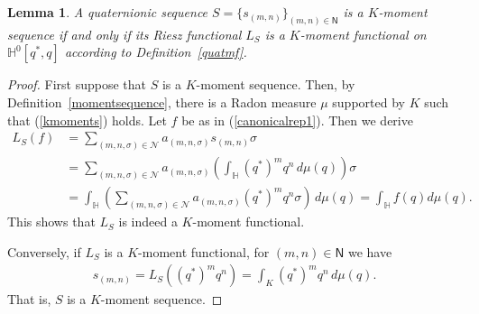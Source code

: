 \documentclass[11pt,a4paper]{amsart}
\newtheorem{lemma}[theorem]{Lemma}
\theoremstyle{definition}
\begin{document}
\begin{lemma}%
\label{Riesz}
A quaternionic sequence $S=\{s_{(m,n)}\}_{(m,n) \in \mathsf{{N}}}$ is a
$K$-moment sequence if and only if its Riesz functional $L_{S}$ is a
$K$-moment functional on $\mathbb{H}^{0}[q^{*}, q]$ according to Definition~\ref{quatmf}.
\end{lemma}
%
\begin{proof}
First suppose that $S$ is a $K$-moment sequence. Then, by Definition~\ref{momentsequence}, there is a Radon measure $\mu $ supported by
$K$ such that (\ref{kmoments}) holds. Let $f$ be as in (\ref{canonicalrep1}).
Then we derive
%
\begin{align*}
L_{S}(f) &= \sum _{(m,n,\sigma )\in \mathcal{N}} a_{(m,n,\sigma )}s_{(m,n)}
\sigma
\\
&= \sum _{(m,n,\sigma )\in \mathcal{N}} a_{(m,n,\sigma )} \left (
\int _{\mathbb{H}} (q^{*})^{m} q^{n}\, d\mu (q)\right ) \sigma
\\
&=\int _{\mathbb{H}} \left (\sum _{(m,n,\sigma )\in \mathcal{N}} a_{(m,n,
\sigma )} (q^{*})^{m} q^{n} \sigma \right )\, d\mu (q)=\int _{
\mathbb{H}} f(q) d\mu (q) .
\end{align*}
%
This shows that $L_{S}$ is indeed a $K$-moment functional.

Conversely, if $L_{S}$ is a $K$-moment functional, for
$(m,n) \in \mathsf{{N}}$ we have
%
\begin{align*}
s_{(m,n)}=L_{S}((q^{*})^{m} q^{n})= \int _{K} (q^{*})^{m} q^{n}\, d
\mu (q).
\end{align*}
%
That is, $S$ is a $K$-moment sequence.
\end{proof}
\end{document}
